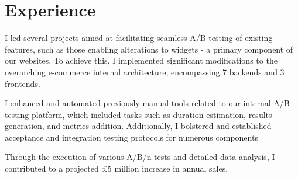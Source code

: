 \documentclass[]{CV}
\begin{document}
%
%


%
%

\begin{minipage}[t]{0.705\textwidth} 



\section{Experience}
\vspace{\topsep} %
\quad
\begin{tightemize}


\item I led several projects aimed at facilitating seamless A/B testing of existing features, such as those enabling alterations to widgets - a primary component of our websites. To achieve this, I implemented significant modifications to the overarching e-commerce internal architecture, encompassing 7 backends and 3 frontends.

\item I enhanced and automated previously manual tools related to our internal A/B testing platform, which included tasks such as duration estimation, results generation, and metrics addition. Additionally, I bolstered and established acceptance and integration testing protocols for numerous components

\quad
\begin{tightemize}


\item Through the execution of various A/B/n tests and detailed data analysis, I contributed to a projected £5 million increase in annual sales.


\end{tightemize}
\end{tightemize}
\end{minipage}
\end{document}
